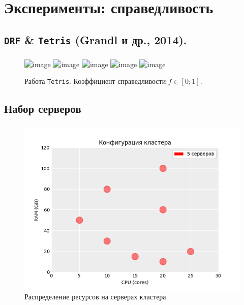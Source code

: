 \documentclass[t]{beamer}  %
\begin{document}
\section{Эксперименты: справедливость}

\subsection{\texttt{DRF} \& \texttt{Tetris} (Grandl и др., 2014).} 

\begin{frame}[fragile]
	\frametitle{\insertsection} 
	\framesubtitle{\insertsubsection}

	\begin{figure}[H]
		\centering
		\includegraphics<1>[width=0.8\linewidth]{images/tetris_pipeline_0} 
		\includegraphics<2>[width=0.8\linewidth]{images/tetris_pipeline_1} 
		\includegraphics<3>[width=0.8\linewidth]{images/tetris_pipeline_2} 
		\includegraphics<4>[width=0.8\linewidth]{images/tetris_pipeline_3} 
		\includegraphics<5>[width=0.8\linewidth]{images/tetris_pipeline_4} 
		\caption*{Работа \texttt{Tetris}. Коэффициент справедливости $f\in[0;1]$.}
	\end{figure}


\end{frame}

\subsection{Набор серверов}

\begin{frame}[fragile]
	\frametitle{\insertsection} 
	\framesubtitle{\insertsubsection}

	\vspace{-0.5cm}
	
\begin{figure}[H]
    \centering 
    \includegraphics[width=0.8\linewidth]{images/hosts_distribution}
    \caption*{Распределение ресурсов на серверах кластера}
\end{figure}


\end{frame}
\end{document}
